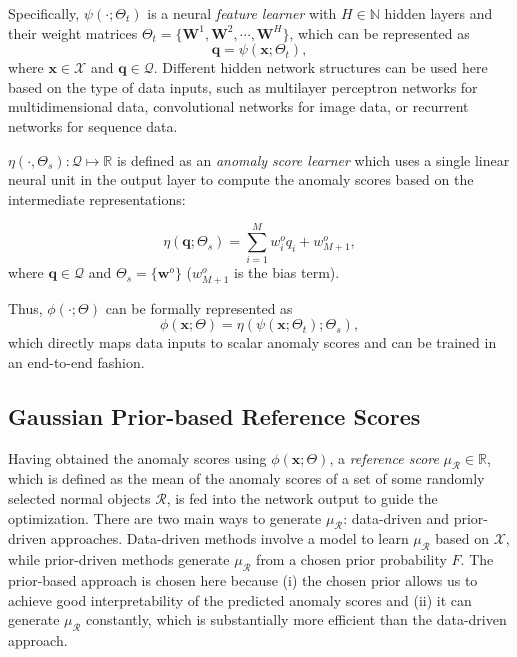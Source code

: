\documentclass[sigconf]{acmart}
\begin{document}
Specifically, $\psi(\cdot; \Theta_{t})$ is a neural \textit{feature learner} with $H \in \mathbb{N}$ hidden layers and their weight matrices $\Theta_{t}=\{\mathbf{W}^{1}, \mathbf{W}^{2}, \cdots, \mathbf{W}^{H}\}$, which can be represented as
\begin{equation}
    \mathbf{q} = \psi(\mathbf{x}; \Theta_{t}),
\end{equation}
where $\mathbf{x} \in \mathcal{X}$ and $\mathbf{q} \in \mathcal{Q}$. Different hidden network structures can be used here based on the type of data inputs, such as multilayer perceptron networks for multidimensional data, convolutional networks for image data, or recurrent networks for sequence data. 

$\eta(\cdot, \Theta_{s}): \mathcal{Q} \mapsto \mathbb{R}$ is defined as an \textit{anomaly score learner} which uses a single linear neural unit in the output layer to compute the anomaly scores based on the intermediate representations:

\begin{equation}
    \eta(\mathbf{q};\Theta_{s}) = \sum_{i=1}^{M}w^{o}_{i} q_{i} + w^{o}_{M+1},
\end{equation}
where $\mathbf{q} \in \mathcal{Q}$ and $\Theta_{s} = \{\mathbf{w}^{o}\} $ ($w^{o}_{M+1}$ is the bias term).


Thus, $\phi(\cdot; \Theta)$ can be formally represented as 
\begin{equation}
    \phi(\mathbf{x};\Theta) = \eta(\psi(\mathbf{x};\Theta_{t});\Theta_s),
\end{equation}
which directly maps data inputs to scalar anomaly scores and can be trained in an end-to-end fashion.

\subsection{Gaussian Prior-based Reference Scores}\label{sec:reference}

Having obtained the anomaly scores using $\phi(\mathbf{x};\Theta)$, a \textit{reference score} $\mu_{\mathcal{R}} \in \mathbb{R}$, which is defined as the mean of the anomaly scores of a set of some randomly selected normal objects $\mathcal{R}$, is fed into the network output to guide the optimization. There are two main ways to generate $\mu_{\mathcal{R}}$: data-driven and prior-driven approaches. Data-driven methods involve a model to learn $\mu_{\mathcal{R}}$ based on $\mathcal{X}$, while prior-driven methods generate $\mu_{\mathcal{R}}$ from a chosen prior probability $F$. The prior-based approach is chosen here because (i) the chosen prior allows us to achieve good interpretability of the predicted anomaly scores and (ii) it can generate $\mu_{\mathcal{R}}$ constantly, which is substantially more efficient than the data-driven approach.
\end{document}
